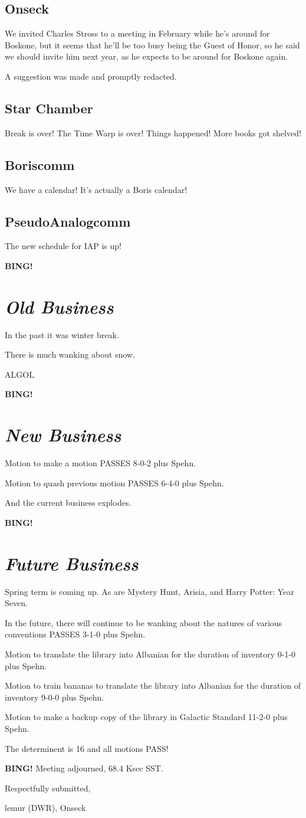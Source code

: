\documentclass[10pt]{article}
\newcommand{\bing}{{\bf BING!} }
\newcommand{\goto}[1]{\bing \vskip 12pt \section*{{\em{#1}}}}
\newcommand{\ps}{ plus Spehn\xspace}
\newcommand{\onseck}{lemur (DWR), Onseck}
\begin{document}
\subsection*{Onseck}

We invited Charles Stross to a meeting in February while he's around for
Boskone, but it seems that he'll be too busy being the Guest of Honor, so
he said we should invite him next year, as he expects to be around for
Boskone again.

A suggestion was made and promptly redacted.

\subsection*{Star Chamber}

Break is over!  The Time Warp is over!  Things happened!  More books got
shelved!

\subsection*{Boriscomm}

We have a calendar!  It's actually a Boris calendar!

\subsection*{PseudoAnalogcomm}

The new schedule for IAP is up!

\goto{Old Business}

In the past it was winter break.

There is much wanking about snow.

ALGOL

\goto{New Business}

Motion to make a motion PASSES 8-0-2\ps.

Motion to quash previous motion PASSES 6-4-0\ps.

And the current business explodes.

\goto{Future Business}

Spring term is coming up.  As are Mystery Hunt, Arisia, and
Harry Potter: Year Seven.

In the future, there will continue to be wanking about the natures
of various conventions PASSES 3-1-0\ps.

Motion to translate the library into Albanian for the duration
of inventory 0-1-0\ps.

Motion to train bananas to translate the library into Albanian
for the duration of inventory 9-0-0\ps.

Motion to make a backup copy of the library in Galactic Standard
11-2-0\ps.

The determinent is 16 and all motions PASS!

\bing
\noindent
Meeting adjourned, 68.4 Ksec SST.

\vspace{18pt}

\centerline{Respectfully submitted,}
\centerline{\onseck}
\end{document}
